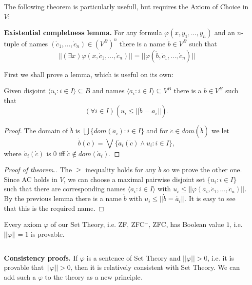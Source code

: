 The following theorem is particularly usefull, but requires the Axiom of Choice in $V$:

\begin{theorem}{\bf Existential completness lemma.} For any formula $\varphi(x,y_1,\ldots,y_n)$ and an $n$-tuple of names $(\dot{c}_1,\ldots,\dot{c}_n)\in (V^B)^n$
 there is a name $\dot{b}\in V^B$ such that
 $$
 ||(\exists x)\varphi(x,\dot{c}_1,\ldots,\dot{c}_n)||=||\varphi(\dot{b},\dot{c}_1,\ldots,\dot{c}_n)||
 $$
\end{theorem}
First we shall prove a lemma, which is useful on its own:
\begin{lemma}
 Given disjoint $\langle u_i:i\in I\rangle\subseteq B$ and names $\langle \dot{a}_i:i\in I\rangle\subseteq V^B$ there is a $\dot{b}\in V^B$ such that
 $$
 (\forall i\in I)(u_i\leq||\dot{b}=a_i||).
 $$
\end{lemma}
\begin{proof} The domain of $\dot{b}$ is $\bigcup\{dom(\dot{a}_i):i\in I\}$ and for $\dot{c}\in dom(\dot{b})$ we let
 $$
 \dot{b}(\dot{c})=\bigvee\{\dot{a}_i(\dot{c})\wedge u_i:i\in I\},
 $$
 where $\dot{a}_i(\dot{c})$ is $0$ iff $\dot{c}\not\in dom(\dot{a}_i)$.
\end{proof}
\begin{proof}[Proof of theorem.] The $\geq$ inequality holds for any $\dot{b}$ so we prove the other one. Since AC holds in $V$, we can choose
a maximal pairwise disjoint set $\{u_i:i\in I\}$ such that there are corresponding names $\langle \dot{a}_i:i\in I\rangle$ with $u_i\leq||\varphi(\dot{a_i},\dot{c}_1,\ldots,\dot{c}_n)||$. By the previous lemma
there is a name $\dot{b}$ with $u_i\leq||\dot{b}=\dot{a_i}||$. It is easy to see that this is the required name.
\end{proof}


\begin{metatheorem}\label{VBmodelsZF} Every axiom $\varphi$ of our Set Theory, i.e. ZF, ZFC$^-$, ZFC, has Boolean value $1$, i.e. $||\varphi||=1$ is provable.
\end{metatheorem}

\subsection{}{\bf Consistency proofs.}\label{ConsistencyProofs} If $\varphi$ is a sentence of Set Theory and $||\varphi||>0$, i.e. it is provable that $||\varphi||>0$,
then it is relatively consistent with Set Theory. We can add such a $\varphi$ to the theory as a new principle.

